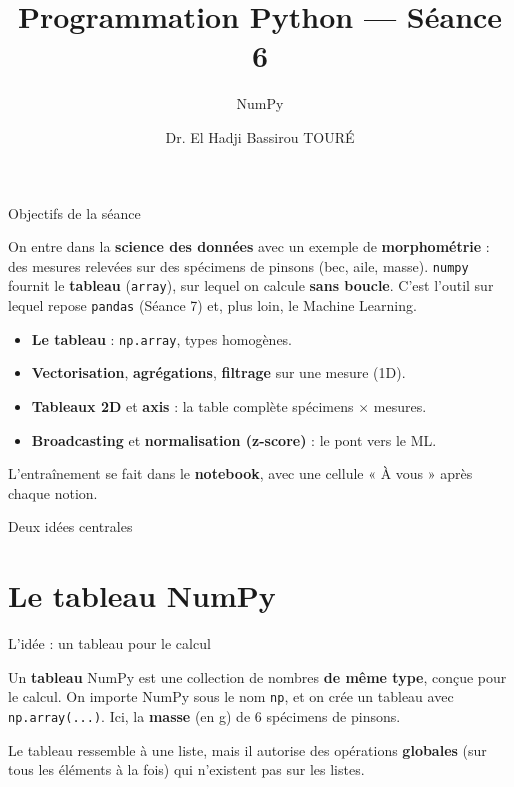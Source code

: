 \documentclass[aspectratio=169,11pt]{beamer}
\title{Programmation Python — Séance 6}
\subtitle{NumPy}
\author{Dr. El Hadji Bassirou TOURÉ}
\institute{Département de Mathématiques et Informatique\\ Faculté des Sciences et Techniques\\ Université Cheikh Anta Diop de Dakar}
\date{}
\begin{document}
\begin{frame}\titlepage\end{frame}

\begin{frame}{Objectifs de la séance}
\begin{ucaddef}[Contenu]
{\small On entre dans la \textbf{science des données} avec un exemple de \textbf{morphométrie} : des mesures relevées sur des spécimens de pinsons (bec, aile, masse). \texttt{numpy} fournit le \textbf{tableau} (\texttt{array}), sur lequel on calcule \textbf{sans boucle}. C'est l'outil sur lequel repose \texttt{pandas} (Séance 7) et, plus loin, le Machine Learning.}
\end{ucaddef}
\begin{itemize}\small
  \item \textbf{Le tableau} : \texttt{np.array}, types homogènes.
  \item \textbf{Vectorisation}, \textbf{agrégations}, \textbf{filtrage} sur une mesure (1D).
  \item \textbf{Tableaux 2D} et \textbf{axis} : la table complète spécimens $\times$ mesures.
  \item \textbf{Broadcasting} et \textbf{normalisation (z-score)} : le pont vers le ML.
\end{itemize}
{\small L'entraînement se fait dans le \textbf{notebook}, avec une cellule « À vous » après chaque notion.}
\end{frame}

\begin{frame}{Deux idées centrales}
\end{frame}

\section{Le tableau NumPy}

\begin{frame}{L'idée : un tableau pour le calcul}
\begin{ucaddef}
{\small Un \textbf{tableau} NumPy est une collection de nombres \textbf{de même type}, conçue pour le calcul. On importe NumPy sous le nom \texttt{np}, et on crée un tableau avec \texttt{np.array(...)}. Ici, la \textbf{masse} (en g) de 6 spécimens de pinsons.}
\end{ucaddef}
{\small Le tableau ressemble à une liste, mais il autorise des opérations \textbf{globales} (sur tous les éléments à la fois) qui n'existent pas sur les listes.}
\end{frame}
\end{document}
